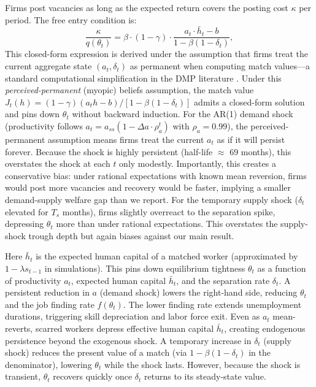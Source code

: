 \documentclass[12pt]{article}
\begin{document}
Firms post vacancies as long as the expected return covers the posting cost $\kappa$ per period. The free entry condition is:
\begin{equation}
\frac{\kappa}{q(\theta_t)} = \beta \cdot (1 - \gamma) \cdot \frac{a_t \cdot \bar{h}_t - b}{1 - \beta(1 - \delta_t)},
\label{eq:freeentry}
\end{equation}
This closed-form expression is derived under the assumption that firms treat the current aggregate state $(a_t, \delta_t)$ as permanent when computing match values---a standard computational simplification in the DMP literature \citep{shimer2005cyclical,hall2005employment}. Under this \textit{perceived-permanent} (myopic) beliefs assumption, the match value $J_t(h) = (1-\gamma)(a_t h - b) / [1-\beta(1-\delta_t)]$ admits a closed-form solution and pins down $\theta_t$ without backward induction. For the AR(1) demand shock (productivity follows $a_t = a_{ss}(1 - \Delta a \cdot \rho_a^t)$ with $\rho_a = 0.99$), the perceived-permanent assumption means firms treat the current $a_t$ as if it will persist forever. Because the shock is highly persistent (half-life $\approx$ 69 months), this overstates the shock at each $t$ only modestly. Importantly, this creates a conservative bias: under rational expectations with known mean reversion, firms would post more vacancies and recovery would be faster, implying a smaller demand-supply welfare gap than we report. For the temporary supply shock ($\delta_t$ elevated for $T_s$ months), firms slightly overreact to the separation spike, depressing $\theta_t$ more than under rational expectations. This overstates the supply-shock trough depth but again biases against our main result.

Here $\bar{h}_t$ is the expected human capital of a matched worker (approximated by $1 - \lambda s_{t-1}$ in simulations). This pins down equilibrium tightness $\theta_t$ as a function of productivity $a_t$, expected human capital $\bar{h}_t$, and the separation rate $\delta_t$. A persistent reduction in $a$ (demand shock) lowers the right-hand side, reducing $\theta_t$ and the job finding rate $f(\theta_t)$. The lower finding rate extends unemployment durations, triggering skill depreciation and labor force exit. Even as $a_t$ mean-reverts, scarred workers depress effective human capital $\bar{h}_t$, creating endogenous persistence beyond the exogenous shock. A temporary increase in $\delta_t$ (supply shock) reduces the present value of a match (via $1 - \beta(1-\delta_t)$ in the denominator), lowering $\theta_t$ while the shock lasts. However, because the shock is transient, $\theta_t$ recovers quickly once $\delta_t$ returns to its steady-state value.
\end{document}
